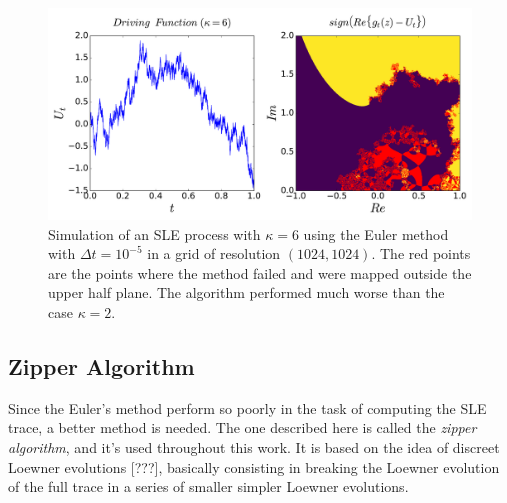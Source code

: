 \begin{figure}
\begin{center}
    \includegraphics[scale=0.45]{chapters/ch4-sle/figs/euler2}
\end{center}
\caption{Simulation of an SLE process with $\kappa=6$ using the Euler method
    with $\Delta t = 10^{-5}$ in a grid of resolution $(1024, 1024)$. 
    The red points are the points where the method failed and were mapped
    outside the upper half plane. The algorithm performed much worse than
    the case $\kappa=2$.}
\label{fig:euler2}
\end{figure}


\subsection{Zipper Algorithm}
\label{ss:zipper}

Since the Euler's method perform so poorly in the task of computing the SLE
trace, a better method is needed. The one described here is called the
\textit{zipper algorithm}, and it's used throughout this work. It is based on
the idea of discreet Loewner evolutions [???], basically consisting in breaking
the Loewner evolution of the full trace in a series of smaller simpler Loewner
evolutions.

